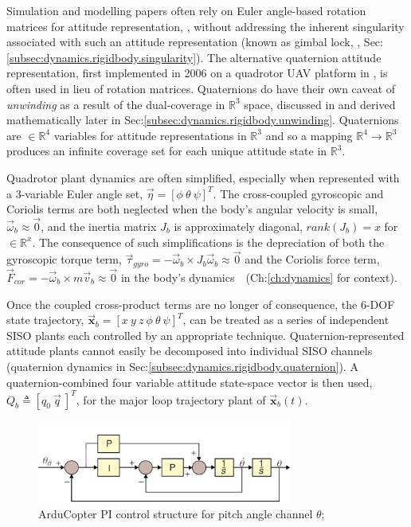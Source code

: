 \par
Simulation and modelling papers often rely on Euler angle-based rotation matrices for attitude representation, \cite{adaptivedisturbancecontrol, optimizedpidquadcopter, singleaxistilting, backsteppingquadcoptercontrol, fullquadcoptercontrol}, without addressing the inherent singularity associated with such an attitude representation (known as gimbal lock, \cite{euleranglesingularity}, Sec:\ref{subsec:dynamics.rigidbody.singularity}). The alternative quaternion attitude representation, first implemented in 2006 on a quadrotor UAV platform in \cite{attitudestabilization}, is often used in lieu of rotation matrices. Quaternions do have their own caveat of \emph{unwinding} as a result of the dual-coverage in $\mathbb{R}^3$ space, discussed in \cite{unwinding} and derived mathematically later in Sec:\ref{subsec:dynamics.rigidbody.unwinding}. Quaternions are $\in\mathbb{R}^4$ variables for attitude representations in $\mathbb{R}^3$ and so a mapping $\mathbb{R}^4\rightarrow\mathbb{R}^3$ produces an infinite coverage set for each unique attitude state in $\mathbb{R}^3$.
\par
Quadrotor plant dynamics are often simplified, especially when represented with a 3-variable Euler angle set, $\vec{\eta} = [\phi ~\theta ~\psi]^T$. The cross-coupled gyroscopic and Coriolis terms are both neglected when the body's angular velocity is small, $\vec{\omega}_b \approx \vec{0}$, and the inertia matrix $J_b$ is approximately diagonal, $rank(J_b)= x$ for $\in\mathbb{R}^x$. The consequence of such simplifications is the depreciation of both the gyroscopic torque term, $\vec{\tau}_{gyro}=-\vec{\omega}_b \times J_b\vec{\omega}_b \approx \vec{0}$ and the  Coriolis force term, $\vec{F}_{cor}=-\vec{\omega}_b \times m\vec{v}_b \approx \vec{0}$ in the body's dynamics~~(Ch:\ref{ch:dynamics} for context). 
\par
Once the coupled cross-product terms are no longer of consequence, the 6-DOF state trajectory, $\vec{\mathbf{x}}_b=[x ~y ~z ~\phi ~\theta ~\psi]^T$, can be treated as a series of independent SISO plants each controlled by an appropriate technique. Quaternion-represented attitude plants cannot easily be decomposed into individual SISO channels (quaternion dynamics in Sec:\ref{subsec:dynamics.rigidbody.quaternion}). A quaternion-combined four variable attitude state-space vector is then used, $Q_b \triangleq [q_0 ~\vec{q}\>]^T$, for the major loop trajectory plant of $\vec{\mathbf{x}}_b(t)$.
\begin{figure}[hbtp]
\vspace{-8pt}
\centering
\includegraphics[width=0.75\textwidth]{figs/arducopter-pi}
\vspace{-2pt}
\caption{ArduCopter PI control structure for pitch angle channel $\theta$; \cite{buildyourownquad}}
\label{fig:arducopter-pi}
\vspace{-10pt}
\end{figure}
